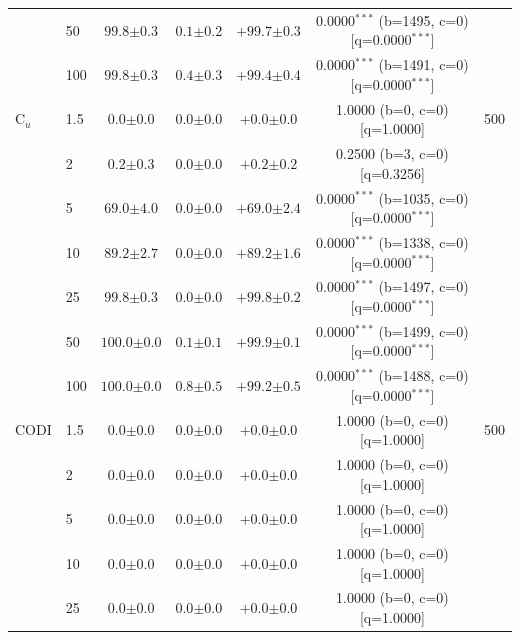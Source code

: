 \begin{table}[h!]
\begin{tabular}{l l cccc c}
 & 50 & $99.8 {\scriptstyle \pm 0.3}$ & $0.1 {\scriptstyle \pm 0.2}$ & $+99.7 {\scriptstyle \pm 0.3}$ & 0.0000$^{***}$ (b=1495, c=0) [q=0.0000$^{***}$] &  \\
 & 100 & $99.8 {\scriptstyle \pm 0.3}$ & $0.4 {\scriptstyle \pm 0.3}$ & $+99.4 {\scriptstyle \pm 0.4}$ & 0.0000$^{***}$ (b=1491, c=0) [q=0.0000$^{***}$] &  \\
\midrule
C$_u$ & 1.5 & $0.0 {\scriptstyle \pm 0.0}$ & $0.0 {\scriptstyle \pm 0.0}$ & $+0.0 {\scriptstyle \pm 0.0}$ & 1.0000 (b=0, c=0) [q=1.0000] & 500 \\
 & 2 & $0.2 {\scriptstyle \pm 0.3}$ & $0.0 {\scriptstyle \pm 0.0}$ & $+0.2 {\scriptstyle \pm 0.2}$ & 0.2500 (b=3, c=0) [q=0.3256] &  \\
 & 5 & $69.0 {\scriptstyle \pm 4.0}$ & $0.0 {\scriptstyle \pm 0.0}$ & $+69.0 {\scriptstyle \pm 2.4}$ & 0.0000$^{***}$ (b=1035, c=0) [q=0.0000$^{***}$] &  \\
 & 10 & $89.2 {\scriptstyle \pm 2.7}$ & $0.0 {\scriptstyle \pm 0.0}$ & $+89.2 {\scriptstyle \pm 1.6}$ & 0.0000$^{***}$ (b=1338, c=0) [q=0.0000$^{***}$] &  \\
 & 25 & $99.8 {\scriptstyle \pm 0.3}$ & $0.0 {\scriptstyle \pm 0.0}$ & $+99.8 {\scriptstyle \pm 0.2}$ & 0.0000$^{***}$ (b=1497, c=0) [q=0.0000$^{***}$] &  \\
 & 50 & $100.0 {\scriptstyle \pm 0.0}$ & $0.1 {\scriptstyle \pm 0.1}$ & $+99.9 {\scriptstyle \pm 0.1}$ & 0.0000$^{***}$ (b=1499, c=0) [q=0.0000$^{***}$] &  \\
 & 100 & $100.0 {\scriptstyle \pm 0.0}$ & $0.8 {\scriptstyle \pm 0.5}$ & $+99.2 {\scriptstyle \pm 0.5}$ & 0.0000$^{***}$ (b=1488, c=0) [q=0.0000$^{***}$] &  \\
\midrule
CODI & 1.5 & $0.0 {\scriptstyle \pm 0.0}$ & $0.0 {\scriptstyle \pm 0.0}$ & $+0.0 {\scriptstyle \pm 0.0}$ & 1.0000 (b=0, c=0) [q=1.0000] & 500 \\
 & 2 & $0.0 {\scriptstyle \pm 0.0}$ & $0.0 {\scriptstyle \pm 0.0}$ & $+0.0 {\scriptstyle \pm 0.0}$ & 1.0000 (b=0, c=0) [q=1.0000] &  \\
 & 5 & $0.0 {\scriptstyle \pm 0.0}$ & $0.0 {\scriptstyle \pm 0.0}$ & $+0.0 {\scriptstyle \pm 0.0}$ & 1.0000 (b=0, c=0) [q=1.0000] &  \\
 & 10 & $0.0 {\scriptstyle \pm 0.0}$ & $0.0 {\scriptstyle \pm 0.0}$ & $+0.0 {\scriptstyle \pm 0.0}$ & 1.0000 (b=0, c=0) [q=1.0000] &  \\
 & 25 & $0.0 {\scriptstyle \pm 0.0}$ & $0.0 {\scriptstyle \pm 0.0}$ & $+0.0 {\scriptstyle \pm 0.0}$ & 1.0000 (b=0, c=0) [q=1.0000] &  \\

\end{tabular}
\end{table}
